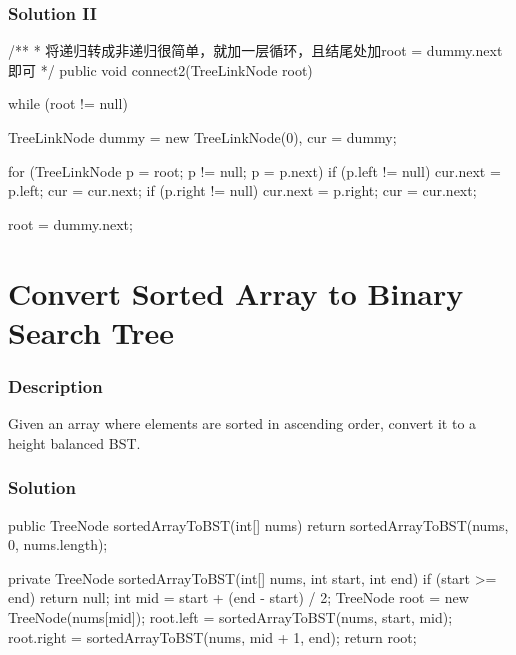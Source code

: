 \subsubsection{Solution II}

\begin{Code}
/**
 * 将递归转成非递归很简单，就加一层循环，且结尾处加root = dummy.next即可
 */
public void connect2(TreeLinkNode root) {
    while (root != null) {
        TreeLinkNode dummy = new TreeLinkNode(0), cur = dummy;

        for (TreeLinkNode p = root; p != null; p = p.next) {
            if (p.left != null) {
                cur.next = p.left;
                cur = cur.next;
            }
            if (p.right != null) {
                cur.next = p.right;
                cur = cur.next;
            }
        }

        root = dummy.next;
    }
}
\end{Code}

\newpage

\section{Convert Sorted Array to Binary Search Tree} %

\subsubsection{Description}

Given an array where elements are sorted in ascending order, convert it to a height balanced BST.

\subsubsection{Solution}

\begin{Code}
public TreeNode sortedArrayToBST(int[] nums) {
    return sortedArrayToBST(nums, 0, nums.length);
}

private TreeNode sortedArrayToBST(int[] nums, int start, int end) {
    if (start >= end) {
        return null;
    }
    int mid = start + (end - start) / 2;
    TreeNode root = new TreeNode(nums[mid]);
    root.left = sortedArrayToBST(nums, start, mid);
    root.right = sortedArrayToBST(nums, mid + 1, end);
    return root;
}
\end{Code}

\newpage

